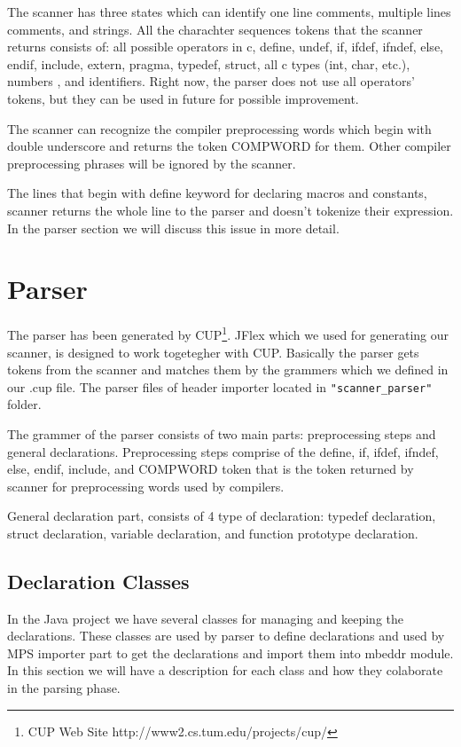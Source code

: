 \documentclass{article}
\begin{document}
The scanner has three states which can identify one line comments, multiple lines comments, and strings. All the charachter sequences tokens that the scanner returns consists of: all possible operators in c, define, undef, if, ifdef, ifndef, else, endif, include, extern, pragma, typedef, struct, all c types (int, char, etc.), numbers , and identifiers. Right now, the parser does not use all operators' tokens, but they can be used in future for possible improvement.

The scanner can recognize the compiler preprocessing words which begin with double underscore and returns the token COMPWORD for them. Other compiler preprocessing phrases will be ignored by the scanner.

The lines that begin with define keyword for declaring macros and constants, scanner returns the whole line to the parser and doesn't tokenize their expression. In the parser section we will discuss this issue in more detail.


\section{Parser}
The parser has been generated by CUP\footnote{CUP Web Site http://www2.cs.tum.edu/projects/cup/}. JFlex which we used for generating our scanner, is designed to work togetegher with CUP. Basically the parser gets tokens from the scanner and matches them by the grammers which we defined in our .cup file. The parser files of header importer located in \texttt{"scanner\_parser"} folder.

The grammer of the parser consists of two main parts: preprocessing steps and general declarations. Preprocessing steps comprise of the define, if, ifdef, ifndef, else, endif, include, and COMPWORD token that is the token returned by scanner for preprocessing words used by compilers.

General declaration part, consists of 4 type of declaration: typedef declaration, struct declaration, variable declaration, and function prototype declaration.

\subsection{Declaration Classes}
In the Java project we have several classes for managing and keeping the declarations. These classes are used by parser to define declarations and used by MPS importer part to get the declarations and import them into mbeddr module. In this section we will have a description for each class and how they colaborate in the parsing phase.
\end{document}
